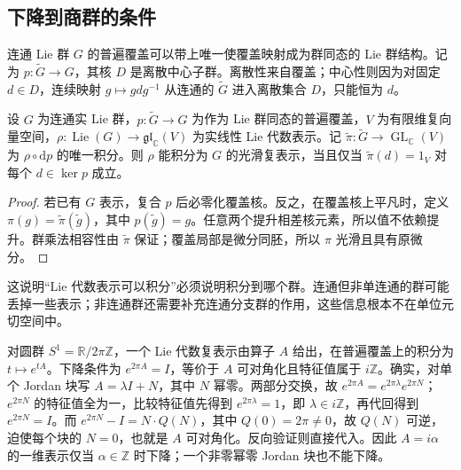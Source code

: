 \subsection{下降到商群的条件}
\label{b5:subsec:C01:02}

连通 Lie 群 \(G\) 的普遍覆盖可以带上唯一使覆盖映射成为群同态的 Lie 群结构。记为 \(p:\widetilde G\to G\)，其核 \(D\) 是离散中心子群。离散性来自覆盖；中心性则因为对固定 \(d\in D\)，连续映射 \(g\mapsto gdg^{-1}\) 从连通的 \(\widetilde G\) 进入离散集合 \(D\)，只能恒为 \(d\)。

\begin{proposition}\label{b5:prop:representation-descent-cover}
	设 \(G\) 为连通实 Lie 群，\(p:\widetilde G\to G\) 为作为 Lie 群同态的普遍覆盖，\(V\) 为有限维复向量空间，\(\rho:\operatorname{Lie}(G)\to\mathfrak{gl}_{\mathbb C}(V)\) 为实线性 Lie 代数表示。记 \(\widetilde\pi:\widetilde G\to\operatorname{GL}_{\mathbb C}(V)\) 为 \(\rho\circ\mathrm{d}p\) 的唯一积分。则 \(\rho\) 能积分为 \(G\) 的光滑复表示，当且仅当 \(\widetilde\pi(d)=1_V\) 对每个 \(d\in\ker p\) 成立。
\end{proposition}
\begin{proof}
	若已有 \(G\) 表示，复合 \(p\) 后必零化覆盖核。反之，在覆盖核上平凡时，定义 \(\pi(g)=\widetilde\pi(\widetilde g)\)，其中 \(p(\widetilde g)=g\)。任意两个提升相差核元素，所以值不依赖提升。群乘法相容性由 \(\widetilde\pi\) 保证；覆盖局部是微分同胚，所以 \(\pi\) 光滑且具有原微分。
\end{proof}

这说明“Lie 代数表示可以积分”必须说明积分到哪个群。连通但非单连通的群可能丢掉一些表示；非连通群还需要补充连通分支群的作用，这些信息根本不在单位元切空间中。

\begin{example}\label{b5:exm:circle-integration}
	对圆群 \(S^1=\mathbb R/2\pi\mathbb Z\)，一个 Lie 代数复表示由算子 \(A\) 给出，在普遍覆盖上的积分为 \(t\mapsto e^{tA}\)。下降条件为 \(e^{2\pi A}=I\)，等价于 \(A\) 可对角化且特征值属于 \(i\mathbb Z\)。确实，对单个 Jordan 块写 \(A=\lambda I+N\)，其中 \(N\) 幂零。两部分交换，故 \(e^{2\pi A}=e^{2\pi\lambda}e^{2\pi N}\)；\(e^{2\pi N}\) 的特征值全为一，比较特征值先得到 \(e^{2\pi\lambda}=1\)，即 \(\lambda\in i\mathbb Z\)，再代回得到 \(e^{2\pi N}=I\)。而 \(e^{2\pi N}-I=N\cdot Q(N)\)，其中 \(Q(0)=2\pi\ne0\)，故 \(Q(N)\) 可逆，迫使每个块的 \(N=0\)，也就是 \(A\) 可对角化。反向验证则直接代入。因此 \(A=i\alpha\) 的一维表示仅当 \(\alpha\in\mathbb Z\) 时下降；一个非零幂零 Jordan 块也不能下降。
\end{example}

